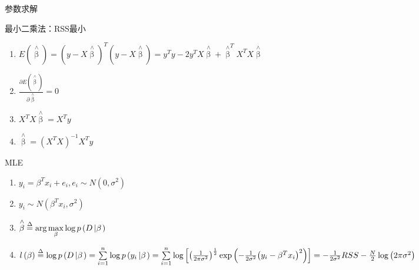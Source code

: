 \documentclass[xetex,mathserif,serif]{beamer}
\begin{document}
\begin{frame}{参数求解}
\begin{block}{最小二乘法：RSS最小}
\begin{enumerate}
  \item $E(\mathop \beta \limits^ \wedge) = {\left( {y  - X\mathop \beta \limits^ \wedge  } \right)^T}\left( {y  - X\mathop \beta \limits^ \wedge  } \right) = y^T y - 2 y^T X \mathop \beta \limits^ \wedge + {\mathop \beta \limits^ \wedge} ^T X ^T X \mathop \beta \limits^ \wedge$
  \item $\frac{{\partial E\left( {\mathop \beta \limits^ \wedge  } \right)}}{{\partial \mathop \beta \limits^ \wedge  }} = 0$
  \item $ X^T X \mathop \beta \limits^ \wedge  = X^T y $
  \item $ \mathop \beta \limits^ \wedge = {\left( {{X^T}X} \right)^{ - 1}}{X^T}y $
\end{enumerate}
\end{block}
\end{frame}

\begin{frame}{MLE}
\begin{enumerate}
  \item ${y_i} = {\beta ^T}{x_i} + {e_i},{e_i} \sim N\left( {0,{\sigma ^2}} \right)$
  \item ${y_i} \sim N\left( {{\beta ^T}{x_i},{\sigma ^2}} \right)$
  \item $\mathop \beta \limits^ \wedge   \buildrel \Delta \over = \arg \mathop {\max }\limits_\beta  \log p\left( {D\left| \beta  \right.} \right)$
 \item $l\left( \beta  \right) \buildrel \Delta \over = \log p\left( {D\left| \beta  \right.} \right) 
 = \sum\limits_{i = 1}^n {\log p\left( {{y_i}\left| \beta  \right.} \right)}  
 = \sum\limits_{i = 1}^n {\log \left[ {{{\left( {\frac{1}{{2\pi {\sigma ^2}}}} \right)}^{\frac{1}{2}}}\exp \left( { - \frac{1}{{2{\sigma ^2}}}{{\left( {{y_i} - {\beta ^T}{x_i}} \right)}^2}} \right)} \right]} 
  =  - \frac{1}{{2{\sigma ^2}}}RSS - \frac{N}{2}\log \left( {2\pi {\sigma ^2}} \right)$
\end{enumerate}
\end{frame}
\end{document}
